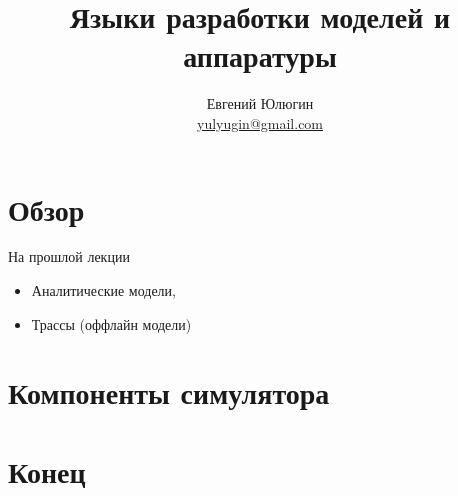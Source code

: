 

\title{Языки разработки моделей и аппаратуры}
\author[Евгений Юлюгин]{Евгений Юлюгин \\ \small{\href{mailto:yulyugin@gmail.com}{yulyugin@gmail.com}}}



\begin{frame}
\titlepage
\end{frame}

\section{Обзор}

\begin{frame}
\tableofcontents
\end{frame} 

\begin{frame}{На прошлой лекции}

\begin{itemize}
  \item Аналитические модели,
  \item Трассы (оффлайн модели)
\end{itemize}

\end{frame}

\section{Компоненты симулятора}

\begin{frame}

\begin{figure}[htp]
\end{figure}

\end{frame}


\section{Конец}

